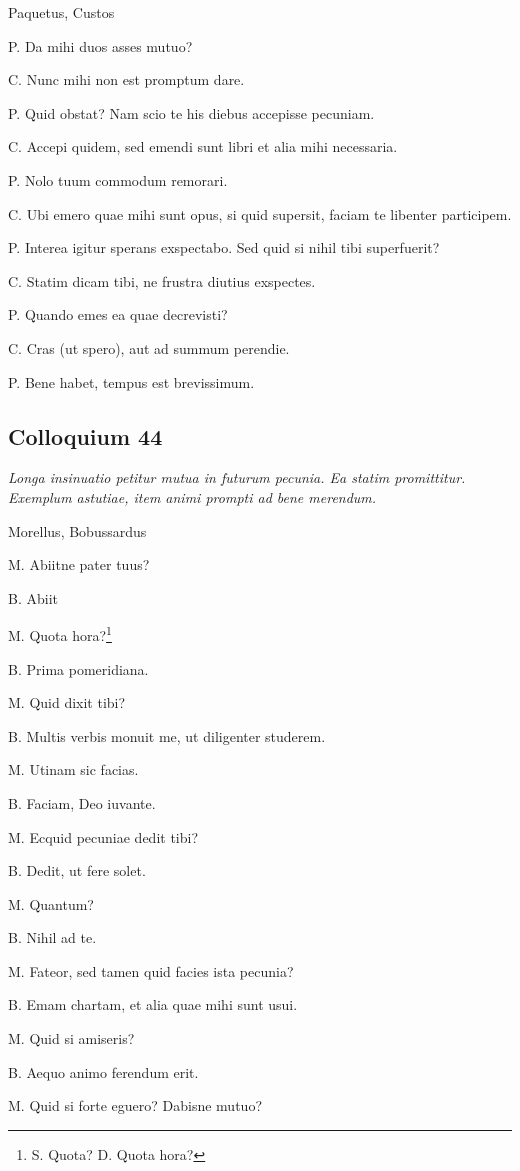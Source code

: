 \documentclass{article}
\begin{document}
Paquetus, Custos

P. Da mihi duos asses mutuo?

C. Nunc mihi non est promptum dare.

P. Quid obstat? Nam scio te his diebus accepisse pecuniam.

C. Accepi quidem, sed emendi sunt libri et alia mihi necessaria.

P. Nolo tuum commodum remorari.

C. Ubi emero quae mihi sunt opus, si quid supersit, faciam te libenter participem.

P. Interea igitur sperans exspectabo. Sed quid si nihil tibi superfuerit?

C. Statim dicam tibi, ne frustra diutius exspectes.

P. Quando emes ea quae decrevisti?

C. Cras (ut spero), aut ad summum perendie.

P. Bene habet, tempus est brevissimum.

\subsection{Colloquium 44}
\emph{Longa insinuatio petitur mutua in futurum pecunia. Ea statim promittitur. Exemplum astutiae, item animi prompti ad bene merendum.}

Morellus, Bobussardus

M. Abiitne pater tuus?

B. Abiit

M. Quota hora?\footnote{S. Quota? D. Quota hora?}

B. Prima pomeridiana.

M. Quid dixit tibi?

B. Multis verbis monuit me, ut diligenter studerem.

M. Utinam sic facias.

B. Faciam, Deo iuvante.

M. Ecquid pecuniae dedit tibi?

B. Dedit, ut fere solet.

M. Quantum?

B. Nihil ad te.

M. Fateor, sed tamen quid facies ista pecunia?

B. Emam chartam, et alia quae mihi sunt usui.

 
M. Quid si amiseris?

B. Aequo animo ferendum erit.

M. Quid si forte eguero? Dabisne mutuo?
\end{document}
